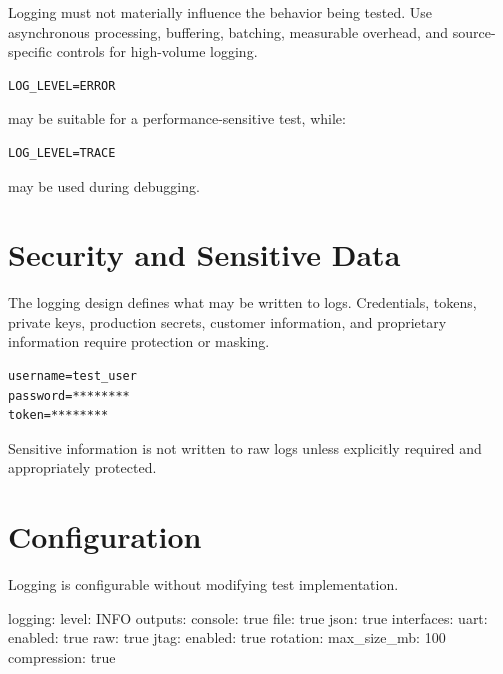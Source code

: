 \documentclass[
  11pt,
  letterpaper,
  DIV=11,
  numbers=noendperiod]{scrartcl}
\newenvironment{Shaded}{}{}
\newcommand{\AttributeTok}[1]{\textcolor[rgb]{0.84,0.23,0.29}{#1}}
\newcommand{\CharTok}[1]{\textcolor[rgb]{0.01,0.18,0.38}{#1}}
\newcommand{\DecValTok}[1]{\textcolor[rgb]{0.00,0.36,0.77}{#1}}
\newcommand{\FunctionTok}[1]{\textcolor[rgb]{0.44,0.26,0.76}{#1}}
\newcommand{\KeywordTok}[1]{\textcolor[rgb]{0.84,0.23,0.29}{#1}}
\begin{document}
Logging must not materially influence the behavior being tested. Use
asynchronous processing, buffering, batching, measurable overhead, and
source-specific controls for high-volume logging.

\begin{verbatim}
LOG_LEVEL=ERROR
\end{verbatim}

may be suitable for a performance-sensitive test, while:

\begin{verbatim}
LOG_LEVEL=TRACE
\end{verbatim}

may be used during debugging.

\section{Security and Sensitive Data}\label{security-and-sensitive-data}

The logging design defines what may be written to logs. Credentials,
tokens, private keys, production secrets, customer information, and
proprietary information require protection or masking.

\begin{verbatim}
username=test_user
password=********
token=********
\end{verbatim}

Sensitive information is not written to raw logs unless explicitly
required and appropriately protected.

\section{Configuration}\label{configuration}

Logging is configurable without modifying test implementation.

\begin{Shaded}
\begin{Highlighting}[]
\FunctionTok{logging}\KeywordTok{:}
\AttributeTok{  }\FunctionTok{level}\KeywordTok{:}\AttributeTok{ INFO}
\AttributeTok{  }\FunctionTok{outputs}\KeywordTok{:}
\AttributeTok{    }\FunctionTok{console}\KeywordTok{:}\AttributeTok{ }\CharTok{true}
\AttributeTok{    }\FunctionTok{file}\KeywordTok{:}\AttributeTok{ }\CharTok{true}
\AttributeTok{    }\FunctionTok{json}\KeywordTok{:}\AttributeTok{ }\CharTok{true}
\AttributeTok{  }\FunctionTok{interfaces}\KeywordTok{:}
\AttributeTok{    }\FunctionTok{uart}\KeywordTok{:}
\AttributeTok{      }\FunctionTok{enabled}\KeywordTok{:}\AttributeTok{ }\CharTok{true}
\AttributeTok{      }\FunctionTok{raw}\KeywordTok{:}\AttributeTok{ }\CharTok{true}
\AttributeTok{    }\FunctionTok{jtag}\KeywordTok{:}
\AttributeTok{      }\FunctionTok{enabled}\KeywordTok{:}\AttributeTok{ }\CharTok{true}
\AttributeTok{  }\FunctionTok{rotation}\KeywordTok{:}
\AttributeTok{    }\FunctionTok{max\_size\_mb}\KeywordTok{:}\AttributeTok{ }\DecValTok{100}
\AttributeTok{    }\FunctionTok{compression}\KeywordTok{:}\AttributeTok{ }\CharTok{true}
\end{Highlighting}
\end{Shaded}
\end{document}
